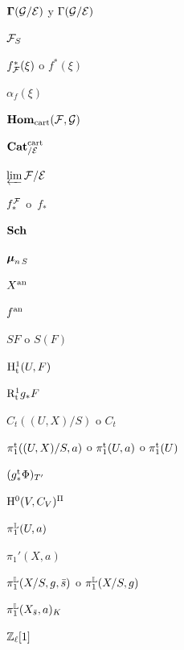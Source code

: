 \begin{theindex}
\medskip\item $\bf{\Gamma}(\cal{G}/\cal{E})$ y $\Gamma(\cal{G}/\cal{E})$\dotfill\pageref{indnot:fm}
\medskip\item $\cal{F}_S$\dotfill\pageref{indnot:fn}
\medskip\item $f^*_{\cal{F}}(\xi)$ o $f^*(\xi)$\dotfill\pageref{indnot:fo}
\medskip\item $\alpha_f(\xi)$\dotfill\pageref{indnot:fp}
\medskip\item $\SheafHom_\cart(\cal{F},\cal{G})$\dotfill\pageref{indnot:fq}
\medskip\item $\Cat^\cart_{/\cal{E}}$\dotfill\pageref{indnot:fr}
\medskip\item $\varprojLim\cal{F}/\cal{E}$\dotfill\pageref{indnot:fs}
\medskip\item $f_*^{\cal{F}}$ o~$f_*$\dotfill\pageref{indnot:ft}
\medskip\item $\Sch$\dotfill\pageref{indnot:hb}
\medskip\item $\bbmu_{n\,S}$\dotfill\pageref{indnot:kb}
\medskip\item $X^\an$\dotfill\pageref{indnot:lb}
\medskip\item $f^\an$\dotfill\pageref{indnot:lc}
\medskip\item $SF$ o $S(F)$\dotfill\pageref{indnot:mb}
\medskip\item $\H^1_\tame(U,F)$\dotfill\pageref{indnot:mc}
\medskip\item $\R^1_\tame g_*F$\dotfill\pageref{indnot:md}
\medskip\item $C_t((U,X)/S)$ o $C_t$\dotfill\pageref{indnot:me}
\medskip\item $\pi_1^\tame((U,X)/S,a)$ o $\pi_1^\tame(U,a)$ o $\pi_1^\tame(U)$\dotfill\pageref{indnot:mf}
\medskip\item $(g_*^\tame\Phi)_{T'}$\dotfill\pageref{indnot:mg}
\medskip\item $\H^0(V,C_V)^\Pi$\dotfill\pageref{indnot:mh}
\medskip\item $\pi_1^\LL(U,a)$\dotfill\pageref{indnot:mi}
\medskip\item $\pi_1'(X,a)$\dotfill\pageref{indnot:mj}
\medskip\item $\pi_1^\LL(X/S,g,\bar{s})$ o $\pi_1^\LL(X/S,g)$\dotfill\pageref{indnot:mk}
\medskip\item $\pi_1^\LL(X_{\bar{s}},a)_K$\dotfill\pageref{indnot:ml}
\medskip\item $\ZZ_\ell[1]$\dotfill\pageref{indnot:mm}
\par
\end{theindex}

